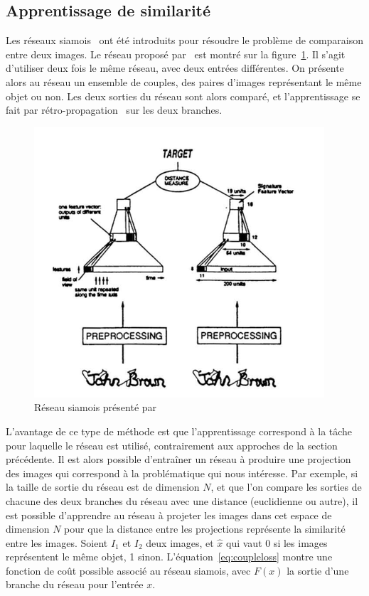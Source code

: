 \subsection{Apprentissage de similarité}
\label{sec:transfertlearning}

Les réseaux siamois~\cite{baldi1993neural, bromley1994signature} ont été introduits pour résoudre le problème de comparaison entre deux images.
Le réseau proposé par~\cite{bromley1994signature} est montré sur la figure~\ref{fig:siamois}.
Il s'agit d'utiliser deux fois le même réseau, avec deux entrées différentes.
On présente alors au réseau un ensemble de couples, des paires d'images représentant le même objet ou non.
Les deux sorties du réseau sont alors comparé, et l'apprentissage se fait par rétro-propagation~\cite{lecun1989backpropagation} sur les deux branches. 

\begin{figure}%
\centering
\includegraphics[width=\columnwidth]{figures/siamese.png}%
\caption{Réseau siamois présenté par~\cite{bromley1994signature}}
\label{fig:siamois}
\end{figure}

L'avantage de ce type de méthode est que l'apprentissage correspond à la tâche pour laquelle le réseau est utilisé, contrairement aux approches de la section précédente.
Il est alors possible d'entraîner un réseau à produire une projection des images qui correspond à la problématique qui nous intéresse.
Par exemple, si la taille de sortie du réseau est de dimension $N$, et que l'on compare les sorties de chacune des deux branches du réseau avec une distance (euclidienne ou autre), il est possible d'apprendre au réseau à projeter les images dans cet espace de dimension $N$ pour que la distance entre les projections représente la similarité entre les images.
Soient $I_1$ et $I_2$ deux images, et $\hat{x}$ qui vaut 0 si les images représentent le même objet, 1 sinon. 
L'équation~\ref{eq:coupleloss} montre une fonction de coût possible associé au réseau siamois, avec $F(x)$ la sortie d'une branche du réseau pour l'entrée $x$.


